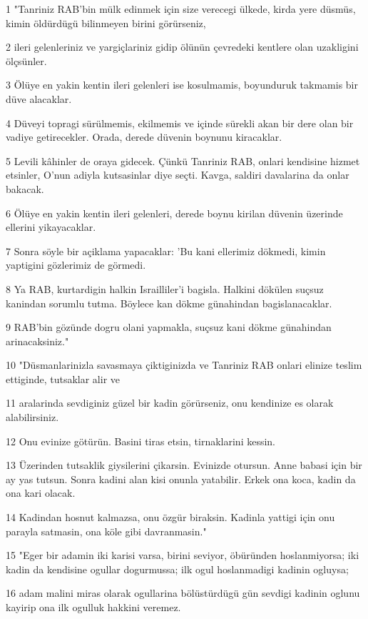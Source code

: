 \par 1 "Tanriniz RAB'bin mülk edinmek için size verecegi ülkede, kirda yere düsmüs, kimin öldürdügü bilinmeyen birini görürseniz,
\par 2 ileri gelenleriniz ve yargiçlariniz gidip ölünün çevredeki kentlere olan uzakligini ölçsünler.
\par 3 Ölüye en yakin kentin ileri gelenleri ise kosulmamis, boyunduruk takmamis bir düve alacaklar.
\par 4 Düveyi topragi sürülmemis, ekilmemis ve içinde sürekli akan bir dere olan bir vadiye getirecekler. Orada, derede düvenin boynunu kiracaklar.
\par 5 Levili kâhinler de oraya gidecek. Çünkü Tanriniz RAB, onlari kendisine hizmet etsinler, O'nun adiyla kutsasinlar diye seçti. Kavga, saldiri davalarina da onlar bakacak.
\par 6 Ölüye en yakin kentin ileri gelenleri, derede boynu kirilan düvenin üzerinde ellerini yikayacaklar.
\par 7 Sonra söyle bir açiklama yapacaklar: 'Bu kani ellerimiz dökmedi, kimin yaptigini gözlerimiz de görmedi.
\par 8 Ya RAB, kurtardigin halkin Israilliler'i bagisla. Halkini dökülen suçsuz kanindan sorumlu tutma. Böylece kan dökme günahindan bagislanacaklar.
\par 9 RAB'bin gözünde dogru olani yapmakla, suçsuz kani dökme günahindan arinacaksiniz."
\par 10 "Düsmanlarinizla savasmaya çiktiginizda ve Tanriniz RAB onlari elinize teslim ettiginde, tutsaklar alir ve
\par 11 aralarinda sevdiginiz güzel bir kadin görürseniz, onu kendinize es olarak alabilirsiniz.
\par 12 Onu evinize götürün. Basini tiras etsin, tirnaklarini kessin.
\par 13 Üzerinden tutsaklik giysilerini çikarsin. Evinizde otursun. Anne babasi için bir ay yas tutsun. Sonra kadini alan kisi onunla yatabilir. Erkek ona koca, kadin da ona kari olacak.
\par 14 Kadindan hosnut kalmazsa, onu özgür biraksin. Kadinla yattigi için onu parayla satmasin, ona köle gibi davranmasin."
\par 15 "Eger bir adamin iki karisi varsa, birini seviyor, öbüründen hoslanmiyorsa; iki kadin da kendisine ogullar dogurmussa; ilk ogul hoslanmadigi kadinin ogluysa;
\par 16 adam malini miras olarak ogullarina bölüstürdügü gün sevdigi kadinin oglunu kayirip ona ilk ogulluk hakkini veremez.
